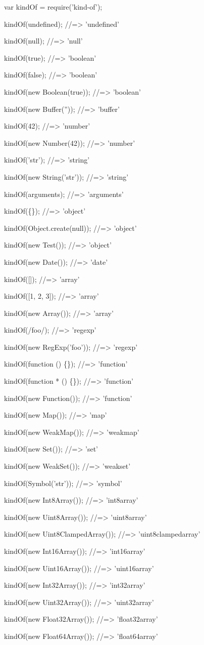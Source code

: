 \begin{DoxyCode}
var kindOf = require('kind-of');

kindOf(undefined);
//=> 'undefined'

kindOf(null);
//=> 'null'

kindOf(true);
//=> 'boolean'

kindOf(false);
//=> 'boolean'

kindOf(new Boolean(true));
//=> 'boolean'

kindOf(new Buffer(''));
//=> 'buffer'

kindOf(42);
//=> 'number'

kindOf(new Number(42));
//=> 'number'

kindOf('str');
//=> 'string'

kindOf(new String('str'));
//=> 'string'

kindOf(arguments);
//=> 'arguments'

kindOf(\{\});
//=> 'object'

kindOf(Object.create(null));
//=> 'object'

kindOf(new Test());
//=> 'object'

kindOf(new Date());
//=> 'date'

kindOf([]);
//=> 'array'

kindOf([1, 2, 3]);
//=> 'array'

kindOf(new Array());
//=> 'array'

kindOf(/foo/);
//=> 'regexp'

kindOf(new RegExp('foo'));
//=> 'regexp'

kindOf(function () \{\});
//=> 'function'

kindOf(function * () \{\});
//=> 'function'

kindOf(new Function());
//=> 'function'

kindOf(new Map());
//=> 'map'

kindOf(new WeakMap());
//=> 'weakmap'

kindOf(new Set());
//=> 'set'

kindOf(new WeakSet());
//=> 'weakset'

kindOf(Symbol('str'));
//=> 'symbol'

kindOf(new Int8Array());
//=> 'int8array'

kindOf(new Uint8Array());
//=> 'uint8array'

kindOf(new Uint8ClampedArray());
//=> 'uint8clampedarray'

kindOf(new Int16Array());
//=> 'int16array'

kindOf(new Uint16Array());
//=> 'uint16array'

kindOf(new Int32Array());
//=> 'int32array'

kindOf(new Uint32Array());
//=> 'uint32array'

kindOf(new Float32Array());
//=> 'float32array'

kindOf(new Float64Array());
//=> 'float64array'
\end{DoxyCode}


